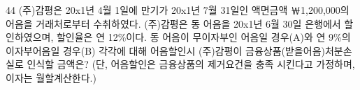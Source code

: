 \begin{question}{44}
(주)감평은 20x1년 4월 1일에 만기가 20x1년 7월 31일인 액면금액 ￦1,200,000의 어음을 거래처로부터 수취하였다. (주)감평은 동 어음을 20x1년 6월 30일 은행에서 할인하였으며, 할인율은 연 12\%이다. 동 어음이 무이자부인 어음일 경우(A)와 연 9\%의 이자부어음일 경우(B) 각각에 대해 어음할인시 (주)감평이 금융상품(받을어음)처분손실로 인식할 금액은? (단, 어음할인은 금융상품의 제거요건을 충족 시킨다고 가정하며, 이자는 월할계산한다.)
{\par\noindent\hspace*{2em}\par}
\begin{choices}
  \item {}
  \item {}
  \item {}
  \item {}
  \item {}
\end{choices}
\end{question}

